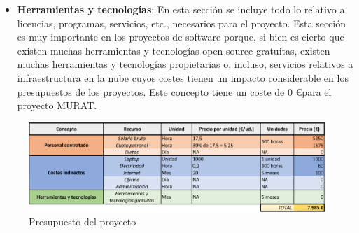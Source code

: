 \begin{itemize}
    \item \textbf{Herramientas y tecnologías}: En esta sección se incluye todo lo relativo a licencias, programas, servicios, etc., necesarios para el proyecto. Esta sección es muy importante en los proyectos de software porque, si bien es cierto que existen muchas herramientas y tecnologías open source gratuitas, existen muchas herramientas y tecnologías propietarias o, incluso, servicios relativos a infraestructura en la nube cuyos costes tienen un impacto considerable en los presupuestos de los proyectos. Este concepto tiene un coste de 0 \euro \space para el proyecto MURAT.
\end{itemize}

\begin{figure}[H]
    \centering
    \includegraphics[width=1\linewidth]{text/image/Presupuesto.pdf}
    \caption{Presupuesto del proyecto}
    \label{fig:presupuesto}
\end{figure}